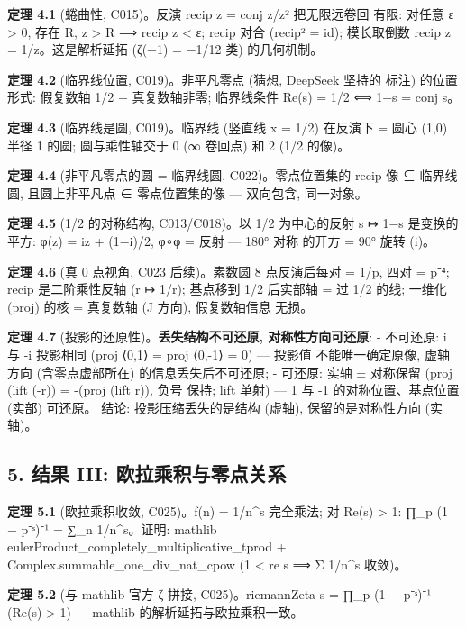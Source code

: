\documentclass[
]{article}
\begin{document}
\textbf{定理 4.1} (蜷曲性, C015)。反演 recip z = conj
z/\textbar z\textbar² 把无限远卷回 有限: 对任意 ε \textgreater{} 0, 存在
R, \textbar z\textbar{} \textgreater{} R ⟹ \textbar recip z\textbar{}
\textless{} ε; recip 对合 (recip² = id); 模长取倒数 \textbar recip
z\textbar{} = 1/\textbar z\textbar。这是解析延拓 (ζ(−1) = −1/12 类)
的几何机制。

\textbf{定理 4.2} (临界线位置, C019)。非平凡零点 (猜想, DeepSeek 坚持的
标注) 的位置形式: 假复数轴 1/2 + 真复数轴非零; 临界线条件 Re(s) = 1/2 ⟺
1−s = conj s。

\textbf{定理 4.3} (临界线是圆, C019)。临界线 (竖直线 x = 1/2) 在反演下 =
圆心 (1,0) 半径 1 的圆; 圆与乘性轴交于 0 (∞ 卷回点) 和 2 (1/2 的像)。

\textbf{定理 4.4} (非平凡零点的圆 = 临界线圆, C022)。零点位置集的 recip
像 ⊆ 临界线圆, 且圆上非平凡点 ∈ 零点位置集的像 --- 双向包含, 同一对象。

\textbf{定理 4.5} (1/2 的对称结构, C013/C018)。以 1/2 为中心的反射 s ↦
1−s 是变换的平方: φ(z) = iz + (1−i)/2, φ∘φ = 反射 --- 180° 对称 的开方 =
90° 旋转 (i)。

\textbf{定理 4.6} (真 0 点视角, C023 后续)。素数圆 8 点反演后每对 = 1/p,
四对 = p⁻⁴; recip 是二阶乘性反轴 (r ↦ 1/r); 基点移到 1/2 后实部轴 = 过
1/2 的线; 一维化 (proj) 的核 = 真复数轴 (J 方向), 假复数轴信息 无损。

\textbf{定理 4.7} (投影的还原性)。\textbf{丢失结构不可还原,
对称性方向可还原}: - 不可还原: i 与 -i 投影相同 (proj ⟨0,1⟩ = proj
⟨0,-1⟩ = 0) --- 投影值 不能唯一确定原像, 虚轴方向 (含零点虚部所在)
的信息丢失后不可还原; - 可还原: 实轴 ± 对称保留 (proj (lift (-r)) =
-(proj (lift r)), 负号 保持; lift 单射) --- 1 与 -1 的对称位置、基点位置
(实部) 可还原。 结论: 投影压缩丢失的是结构 (虚轴), 保留的是对称性方向
(实轴)。

\subsection{5. 结果 III:
欧拉乘积与零点关系}\label{ux7ed3ux679c-iii-ux6b27ux62c9ux4e58ux79efux4e0eux96f6ux70b9ux5173ux7cfb}

\textbf{定理 5.1} (欧拉乘积收敛, C025)。f(n) = 1/n\^{}s 完全乘法; 对
Re(s) \textgreater{} 1: ∏\_p (1 − p⁻ˢ)⁻¹ = ∑\_n 1/n\^{}s。证明: mathlib
eulerProduct\_completely\_multiplicative\_tprod +
Complex.summable\_one\_div\_nat\_cpow (1 \textless{} re s ⟹ Σ 1/n\^{}s
收敛)。

\textbf{定理 5.2} (与 mathlib 官方 ζ 拼接, C025)。riemannZeta s = ∏\_p
(1 − p⁻ˢ)⁻¹ (Re(s) \textgreater{} 1) --- mathlib
的解析延拓与欧拉乘积一致。
\end{document}
